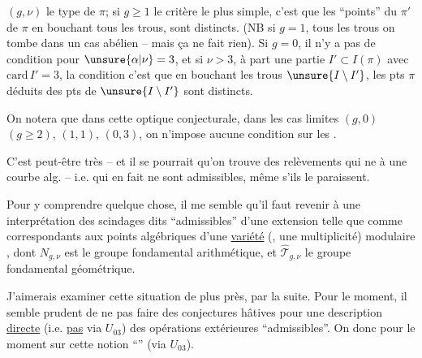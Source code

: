  $(g,\nu)$ le type de $\pi$;  si $g\geq1$ le critère le plus simple, c'est que les ``\inserted{$\Gamma^{\unsure{\natural}}$-}points'' du $\pi'$  de $\pi$ en bouchant tous les trous, sont distincts.  (NB si $g=1$,    tous les trous on tombe dans un cas abélien -- mais ça ne fait rien). Si $g=0$,  il n'y a pas de condition pour $\unsure{\alpha|\nu}=3$, et si $\nu>3$,  à part une  partie $I'\subset I(\pi)$ avec $\mathrm{card}\,I'=3$, la condition c'est que en bouchant les trous  $\unsure{I\setminus I'}$, les \inserted{$\Gamma^{\unsure{\natural}}$-}pts  $\pi$ déduits des pts de $\unsure{I\setminus I'}$ sont distincts.

On notera que dans cette optique conjecturale, dans les cas limites $(g,0)$ $(g\geq2)$, $(1,1)$, $(0,3)$, on n'impose aucune condition  sur les .



C'est peut-être très  -- et il se pourrait qu'on trouve des relèvements qui ne   à une courbe alg. -- i.e. qui en fait ne sont  admissibles, même s'ils le paraissent.

Pour y comprendre quelque chose, il me semble qu'il faut revenir à une interprétation des  scindages dits ``admissibles'' d'une extension telle que
comme correspondants aux points algébriques d'une \uline{variété} (, une multiplicité) modulaire , dont $N_{g,\nu}$ est le groupe fondamental arithmétique, et $\widehat{\mathcal T}_{g,\nu}$ le groupe fondamental géométrique.

J'aimerais examiner cette situation de plus près, par la suite. Pour le moment, il semble prudent de ne pas faire des conjectures hâtives pour  une description \uline{directe} (i.e. \uline{pas} via $U_{03}$) des opérations extérieures ``admissibles''. On  donc pour le moment sur cette notion   ``'' (via $U_{03}$).

